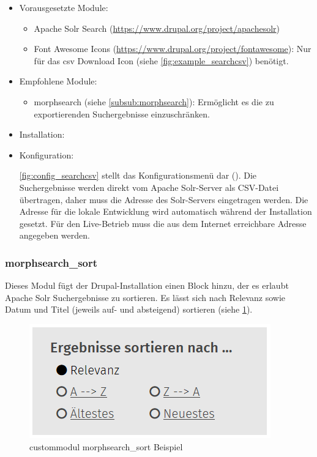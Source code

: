 \begin{itemize}[parsep=0pt, itemsep=5.0pt plus 2.0pt minus 1.0pt, leftmargin=*]
	\item Vorausgesetzte Module:

	\begin{itemize}
		\item 	Apache Solr Search (\url{https://www.drupal.org/project/apachesolr})

		\item Font Awesome Icons (\url{https://www.drupal.org/project/fontawesome}): Nur für das csv Download Icon (siehe \cref{fig:example_searchcsv}) benötigt.
	\end{itemize}


	\item Empfohlene Module:

	\begin{itemize}
		\item morphsearch (siehe \cref{subsub:morphsearch}): Ermöglicht es die zu exportierenden Suchergebnisse einzuschränken.
	\end{itemize}


	\item Installation: \standardinstall

	\item Konfiguration:

	\cref{fig:config_searchcsv} stellt das Konfigurationsmenü dar (). Die Suchergebnisse werden direkt vom Apache Solr-Server als CSV-Datei übertragen, daher muss die Adresse des Solr-Servers eingetragen werden. Die Adresse für die lokale Entwicklung wird automatisch während der Installation gesetzt. Für den Live-Betrieb muss die aus dem Internet erreichbare Adresse angegeben werden.

\end{itemize}






\newpage
\subsubsection{morphsearch\_sort}\label{subsub:morphsearchsort}
Dieses Modul fügt der Drupal-Installation einen Block hinzu, der es erlaubt Apache Solr Suchergebnisse zu sortieren. Es lässt sich nach Relevanz sowie Datum und Titel (jeweils auf- und absteigend) sortieren (siehe \cref{fig:example_morphsearchsort}).


\begin{figure}[H]
	\centering
	\includegraphics[height=0.10\textheight]{images/example_morphsearchsort}
	\caption{\gls{custommodul} morphsearch\_sort Beispiel}
	\label{fig:example_morphsearchsort}
\end{figure}

